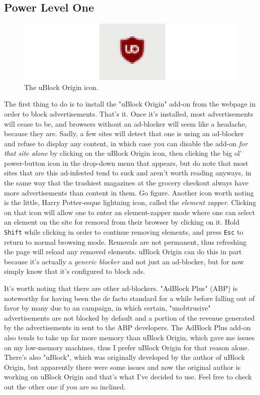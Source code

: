 \documentclass{article}
\begin{document}
\subsection{Power Level One}
\begin{figure}
\includegraphics[scale=0.5]{files/blog/2018_01_17_better_browsing_with_firefox/2018_01_17_ublockorigin_icon.png}
\caption{The uBlock Origin icon.}
\end{figure}
The first thing to do is to install the "uBlock Origin" add-on from the  webpage in order to block advertisements.  That's it.  Once it's installed, most advertisements will cease to be, and browsers without an ad-blocker will seem like a headache, because they are.  Sadly, a few sites will detect that one is using an ad-blocker and refuse to display any content, in which case you can disable the add-on \textit{for that site alone} by clicking on the uBlock Origin icon, then clicking the big ol' power-button icon in the drop-down menu that appears, but do note that most sites that are this ad-infested tend to suck and aren't worth reading anyways, in the same way that the trashiest magazines at the grocery checkout always have more advertisements than content in them.  Go figure.  Another icon worth noting is the little, Harry Potter-esque lightning icon, called the \textit{element zapper}.  Clicking on that icon will allow one to enter an element-zapper mode where one can select an element on the site for removal from their browser by clicking on it.  Hold \texttt{Shift} while clicking in order to continue removing elements, and press \texttt{Esc} to return to normal browsing mode.  Removals are not permanent, thus refreshing the page will reload any removed elements.  uBlock Origin can do this in part because it's actually a \textit{generic blocker} and not just an ad-blocker, but for now simply know that it's configured to block ads.

It's worth noting that there are other ad-blockers.  "AdBlock Plus" (ABP) is noteworthy for having been the de facto standard for a while before falling out of favor by many due to an  campaign, in which certain, "unobtrusive" advertisements are not blocked by default and a portion of the revenue generated by the advertisements in sent to the ABP developers.  The AdBlock Plus add-on also tends to take up far more memory than uBlock Origin, which gave me issues on my low-memory machines, thus I prefer uBlock Origin for that reason alone.  There's also "uBlock", which was originally developed by the author of uBlock Origin, but apparently there were some issues and now the original author is working on uBlock Origin and that's what I've decided to use.  Feel free to check out the other one if you are so inclined.
\end{document}
